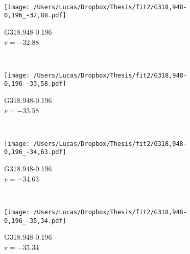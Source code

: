 \begin{figure*}[t]
\begin{subfigure}[t]{0.3\textwidth}
	\end{subfigure}
	~
	\begin{subfigure}[t]{0.3\textwidth}
		\texttt{[image: /Users/Lucas/Dropbox/Thesis/fit2/G318,948-0,196\_-32,88.pdf]}
		\caption[]{G318.948-0.196\\$v=-32.88$\,\kms}
	\end{subfigure}
	~
	\begin{subfigure}[t]{0.3\textwidth}
		\texttt{[image: /Users/Lucas/Dropbox/Thesis/fit2/G318,948-0,196\_-33,58.pdf]}
		\caption[]{G318.948-0.196\\$v=-33.58$\,\kms}
	\end{subfigure}
	~
	\begin{subfigure}[t]{0.3\textwidth}
		\texttt{[image: /Users/Lucas/Dropbox/Thesis/fit2/G318,948-0,196\_-34,63.pdf]}
		\caption[]{G318.948-0.196\\$v=-34.63$\,\kms}
	\end{subfigure}
	~
	\begin{subfigure}[t]{0.3\textwidth}
		\texttt{[image: /Users/Lucas/Dropbox/Thesis/fit2/G318,948-0,196\_-35,34.pdf]}
		\caption[]{G318.948-0.196\\$v=-35.34$\,\kms}
	\end{subfigure}
	~
\end{figure*}
\clearpage

